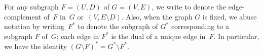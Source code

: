 \documentclass[twoside,leqno,twocolumn]{article}
\def\arcto{\mathord\shortrightarrow}
\def\arc#1#2{#1\arcto#2}
\begin{document}
%
%


For any subgraph $F = (U,D)$ of $G = (V,E)$, we write  to denote the edge-complement of~$F$ in~$G$ or~${(V, E\setminus D)}$.  Also, when the graph $G$ is fixed, we abuse notation by writing~$F^*$ to denote the subgraph of $G^*$ corresponding to a subgraph $F$ of~$G$; each edge in $F^*$ is the dual of a unique edge in~$F$.  In particular, we have the identity $(G\setminus F)^* = G^* \setminus F^*$.

\end{document}
